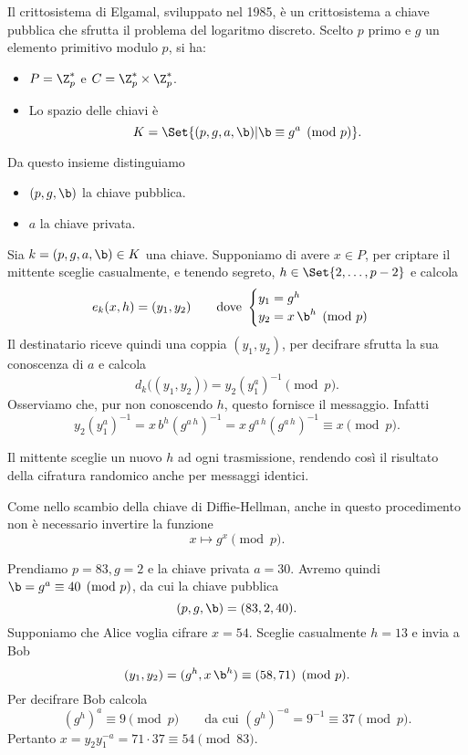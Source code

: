 	Il crittosistema di Elgamal, sviluppato nel 1985, è un crittosistema a chiave pubblica che sfrutta il problema del logaritmo discreto.
	Scelto \(p\) primo e \(g\) un elemento primitivo modulo \(p\), si ha:
	\begin{itemize}
		\item \(P=\Z_p^*\) e \(C=\Z_p^* \times \Z_p^*\).
		\item Lo spazio delle chiavi è
			\[
			K = \Set{(p,g,a,\b) | \b\equiv g^a \pmod{p}}.
			\]
	\end{itemize}
	Da questo insieme distinguiamo
	\begin{itemize}
		\item \((p,g,\b)\) la chiave pubblica.
		\item \(a\) la chiave privata.
	\end{itemize}
	Sia \(k=(p,g,a,\b)\in K\) una chiave.
	Supponiamo di avere \(x\in P\), per criptare il mittente sceglie casualmente, e tenendo segreto, \(h\in\Set{2,\ldots,p-2}\) e calcola
		\[
		e_k(x,h) = (y_1,y_2) \qquad\text{dove } \begin{cases}
												y_1 = g^h\\
												y_2 = x\,\b^h \pmod{p}
												\end{cases}
		\]
	Il destinatario riceve quindi una coppia \((y_1,y_2)\), per decifrare sfrutta la sua conoscenza di \(a\) e calcola
		\[
		d_k\big((y_1,y_2)\big) = y_2 {(y_1^a)}^{-1} \pmod{p}.
		\]
	Osserviamo che, pur non conoscendo \(h\), questo fornisce il messaggio. Infatti
		\[
		y_2{(y_1^a)}^{-1} = x\,b^h{(g^{a\,h})}^{-1} = x\,g^{a\,h}{(g^{a\,h})}^{-1} \equiv x \pmod{p}.
		\]

	\begin{oss}
	Il mittente sceglie un nuovo \(h\) ad ogni trasmissione, rendendo così il risultato della cifratura randomico anche per messaggi identici.
	\end{oss}

	\begin{oss}
	Come nello scambio della chiave di Diffie-Hellman, anche in questo procedimento non è necessario invertire la funzione
		\[
		x \longmapsto g^x \pmod{p}.
		\]
	\end{oss}

	\begin{ese}
	Prendiamo \(p=83,g=2\) e la chiave privata \(a=30\). Avremo quindi \(\b=g^a \equiv 40 \pmod{p}\), da cui la chiave pubblica
		\[
		(p,g,\b) = (83,2,40).
		\]
	Supponiamo che Alice voglia cifrare \(x=54\). Sceglie casualmente \(h=13\) e invia a Bob
		\[
		(y_1,y_2) = (g^h,x\,\b^h) \equiv (58,71) \pmod{p}.
		\]
	Per decifrare Bob calcola
		\[
		{(g^h)}^a \equiv 9 \pmod{p} \qquad\text{da cui }{(g^h)}^{-a} = 9^{-1} \equiv 37 \pmod{p}.
		\]
	Pertanto \(x = y_2 y_1^{-a} = 71 \cdot 37 \equiv 54 \pmod{83}\).
	\end{ese}

